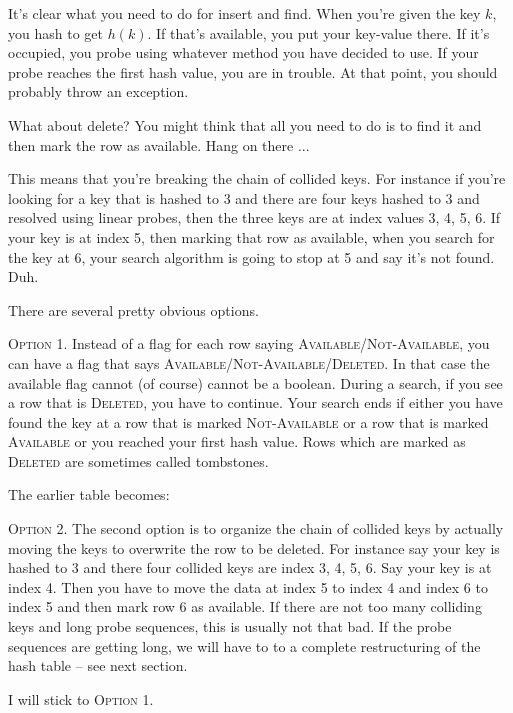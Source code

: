 
It's clear what you need to do for insert and find.
When you're given the key $k$, you hash to get $h(k)$.
If that's available, you put your key-value there.
If it's occupied, you probe using whatever method you have decided to use.
If your probe reaches the first hash value, you are in trouble.
At that point, you should probably throw an exception.

What about delete?
You might think that all you need to do is to find it
and then mark the row as available.
Hang on there ...

This means that you're breaking the chain of collided keys.
For instance if you're looking for a key that is hashed to
3 and there are four keys hashed to 3 and resolved using linear 
probes, then the three keys are at index values 3, 4, 5, 6.
If your key is at index 5, then marking that row as available,
when you search for the key at 6, your search algorithm is
going to stop at 5 and say it's not found. Duh.

There are several pretty obvious options.

\textsc{Option 1.}
Instead of a flag for each row saying
\textsc{Available}/\textsc{Not-Available},
you can have a flag that says
\textsc{Available}/\textsc{Not-Available}/\textsc{Deleted}.
In that case the available flag cannot (of course) cannot be a boolean.
During a search, if you see a row that is \textsc{Deleted},
you have to continue.
Your search ends if either you have found the key at a row that is
marked \textsc{Not-Available} or a row that is marked
\textsc{Available} or you reached
your first hash value.
Rows which are marked as \textsc{Deleted} are sometimes called tombstones.

The earlier table becomes:


\textsc{Option 2.}
The second option is to organize the chain of collided keys by 
actually moving the keys to overwrite the row to be deleted.
For instance say your key is hashed to 3 and there four 
collided keys are index 3, 4, 5, 6.
Say your key is at index 4.
Then you have to move the data at index 5 to index 4 and index 6 to index 5
and then mark row 6 as available.
If there are not too many colliding keys and long probe sequences,
this is usually not that bad.
If the probe sequences are getting long, we will have to to a 
complete restructuring of the hash table -- see next section.

I will stick to \textsc{Option 1}.

